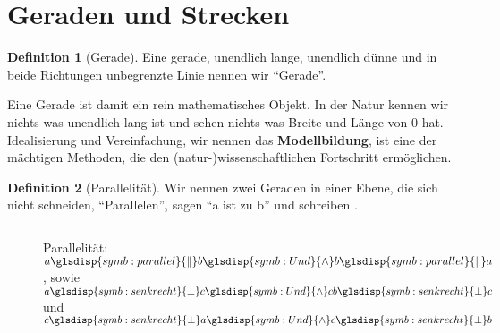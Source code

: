 \documentclass[a4paper]{book}%
\theoremstyle{definition}
\newtheorem{definition}{Definition}
\begin{document}
\section{Geraden und Strecken}

\begin{definition}[Gerade]\label{def:Gerade}
    Eine gerade, unendlich lange, unendlich dünne und in beide Richtungen unbegrenzte Linie nennen wir \enquote{Gerade}.
\end{definition}

Eine Gerade ist damit ein rein mathematisches Objekt. In der Natur kennen wir nichts was unendlich lang ist und sehen nichts was Breite und Länge von 0 hat. Idealisierung und Vereinfachung, wir nennen das \textbf{Modellbildung}, ist eine der mächtigen Methoden, die den (natur-)wissenschaftlichen Fortschritt ermöglichen.

\begin{definition}[Parallelität]\label{def:parallel}
    Wir nennen zwei Geraden in einer Ebene, die sich nicht schneiden, \enquote{Parallelen}, sagen \enquote{a ist  zu b} und schreiben .
\end{definition}

\begin{figure}
  \centering
    $\quad$

  \caption{Parallelität: $a \glsdisp{symb:parallel}{\|} b \glsdisp{symb:Und}{\wedge} b \glsdisp{symb:parallel}{\|} a$, sowie $a \glsdisp{symb:senkrecht}{\bot} c \glsdisp{symb:Und}{\wedge} c b \glsdisp{symb:senkrecht}{\bot} c$ und $c \glsdisp{symb:senkrecht}{\bot} a \glsdisp{symb:Und}{\wedge} c \glsdisp{symb:senkrecht}{\bot} b$}\label{fig:Parallelitaet}
\end{figure}
\end{document}
